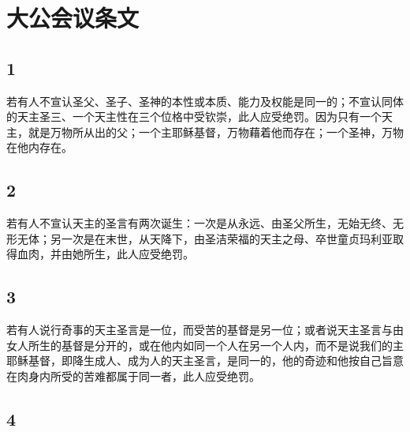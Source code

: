 
\section{大公会议条文}


\subsection{1}

若有人不宣认圣父、圣子、圣神的本性或本质、能力及权能是同一的；不宣认同体的天主圣三、一个天主性在三个位格中受钦崇，此人应受绝罚。因为只有一个天主，就是万物所从出的父；一个主耶稣基督，万物藉着他而存在；一个圣神，万物在他内存在。\par


\subsection{2}

若有人不宣认天主的圣言有两次诞生：一次是从永远、由圣父所生，无始无终、无形无体；另一次是在末世，从天降下，由圣洁荣福的天主之母、卒世童贞玛利亚取得血肉，并由她所生，此人应受绝罚。\par


\subsection{3}

若有人说行奇事的天主圣言是一位，而受苦的基督是另一位；或者说天主圣言与由女人所生的基督是分开的，或在他内如同一个人在另一个人内，而不是说我们的主耶稣基督，即降生成人、成为人的天主圣言，是同一的，他的奇迹和他按自己旨意在肉身内所受的苦难都属于同一者，此人应受绝罚。\par


\subsection{4}


